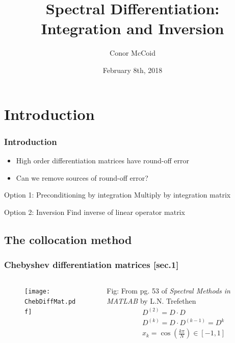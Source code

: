 \documentclass{beamer}
\title{Spectral Differentiation: Integration and Inversion}
\author{Conor McCoid}
\institute{Simon Fraser University}
\date{February 8th, 2018}
\begin{document}
\frame{\titlepage}

\section{Introduction}

\begin{frame}
\frametitle{Introduction}
\begin{itemize}
\item High order differentiation matrices have round-off error
\item Can we remove sources of round-off error?
\end{itemize}

\begin{block}{Option 1: Preconditioning by integration}
Multiply by integration matrix
\end{block}

\begin{block}{Option 2: Inversion}
Find inverse of linear operator matrix
\end{block}
\end{frame}

\subsection{The collocation method}

\begin{frame}
\frametitle{Chebyshev differentiation matrices [sec.1]}

\begin{columns}

\begin{column}{0.5\textwidth}
\begin{figure}
\texttt{[image: ChebDiffMat.pdf]}
\end{figure}
\end{column}
\begin{column}{0.5\textwidth}
Fig: From pg. 53 of \textit{Spectral Methods in MATLAB} by L.N. Trefethen
\begin{equation*} \label{diff matrix}
\begin{gathered}
D^{(2)} = D \cdot D \\ D^{(k)} = D \cdot D^{(k-1)} = D^k \\
x_k = \cos \left ( \frac{k \pi}{N} \right ) \in [-1,1]
\end{gathered}
\end{equation*}
\end{column}

\end{columns}
\end{frame}
\end{document}
